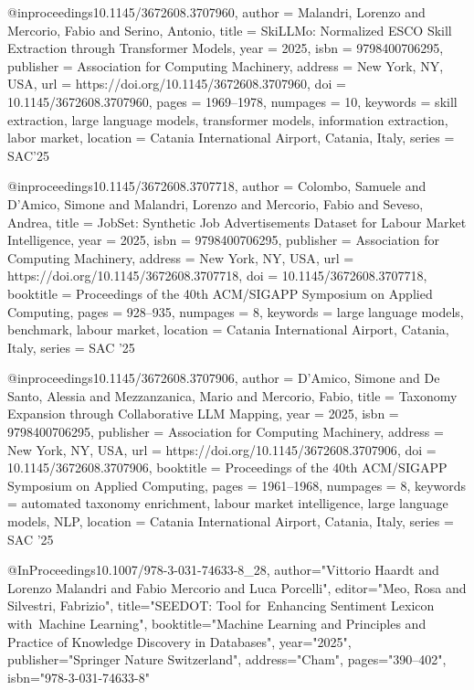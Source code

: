 @inproceedings{10.1145/3672608.3707960,
author = {Malandri, Lorenzo and Mercorio, Fabio and Serino, Antonio},
title = {SkiLLMo: Normalized ESCO Skill Extraction through Transformer Models},
year = {2025},
isbn = {9798400706295},
publisher = {Association for Computing Machinery},
address = {New York, NY, USA},
url = {https://doi.org/10.1145/3672608.3707960},
doi = {10.1145/3672608.3707960},
pages = {1969–1978},
numpages = {10},
keywords = {skill extraction, large language models, transformer models, information extraction, labor market},
location = {Catania International Airport, Catania, Italy},
series = {SAC'25}
}

@inproceedings{10.1145/3672608.3707718,
author = {Colombo, Samuele and D'Amico, Simone and Malandri, Lorenzo and Mercorio, Fabio and Seveso, Andrea},
title = {JobSet: Synthetic Job Advertisements Dataset for Labour Market Intelligence},
year = {2025},
isbn = {9798400706295},
publisher = {Association for Computing Machinery},
address = {New York, NY, USA},
url = {https://doi.org/10.1145/3672608.3707718},
doi = {10.1145/3672608.3707718},
booktitle = {Proceedings of the 40th ACM/SIGAPP Symposium on Applied Computing},
pages = {928–935},
numpages = {8},
keywords = {large language models, benchmark, labour market},
location = {Catania International Airport, Catania, Italy},
series = {SAC '25}
}


@inproceedings{10.1145/3672608.3707906,
author = {D'Amico, Simone and De Santo, Alessia and Mezzanzanica, Mario and Mercorio, Fabio},
title = {Taxonomy Expansion through Collaborative LLM Mapping},
year = {2025},
isbn = {9798400706295},
publisher = {Association for Computing Machinery},
address = {New York, NY, USA},
url = {https://doi.org/10.1145/3672608.3707906},
doi = {10.1145/3672608.3707906},
booktitle = {Proceedings of the 40th ACM/SIGAPP Symposium on Applied Computing},
pages = {1961–1968},
numpages = {8},
keywords = {automated taxonomy enrichment, labour market intelligence, large language models, NLP},
location = {Catania International Airport, Catania, Italy},
series = {SAC '25}
}

@InProceedings{10.1007/978-3-031-74633-8_28,
author="Vittorio Haardt and Lorenzo Malandri and Fabio Mercorio and Luca Porcelli",
editor="Meo, Rosa
and Silvestri, Fabrizio",
title="SEEDOT: Tool for Enhancing Sentiment Lexicon with Machine Learning",
booktitle="Machine Learning and Principles and Practice of Knowledge Discovery in Databases",
year="2025",
publisher="Springer Nature Switzerland",
address="Cham",
pages="390--402",
isbn="978-3-031-74633-8"
}

